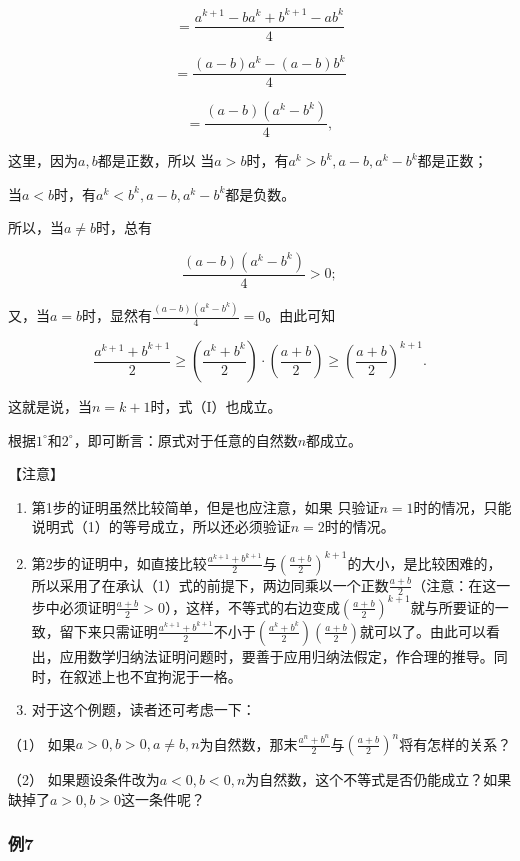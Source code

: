 \[
= \frac{a^{k + 1} - b a^{k} + b^{k + 1} - a b^{k}}{4}
\]

\[
= \frac{(a - b) a^{k} - (a - b) b^{k}}{4}
\]

\[
= \frac{(a - b) (a^{k} - b^{k})}{4}, \tag {4}
\]

这里，因为\(a, b\)都是正数，所以
当\(a > b\)时，有\(a^k > b^k, a - b, a^k - b^k\)都是正数；

当\(a < b\)时，有\(a^k < b^k, a - b, a^k - b^k\)都是负数。

所以，当\(a \neq b\)时，总有

\[
\frac{(a - b) (a^{k} - b^{k})}{4} > 0;
\]

又，当\(a = b\)时，显然有\(\frac{(a - b)(a^k - b^k)}{4} = 0\)。由此可知

\[
\frac{a^{k + 1} + b^{k + 1}}{2} \geqslant \left(\frac{a^{k} + b^{k}}{2}\right) \cdot \left(\frac{a + b}{2}\right) \geqslant \left(\frac{a + b}{2}\right)^{k + 1}.
\]

这就是说，当\(n = k + 1\)时，式（I）也成立。

根据\(1^{\circ}\)和\(2^{\circ}\)，即可断言：原式对于任意的自然数\(n\)都成立。

【注意】

\begin{enumerate}
\item
  第1步的证明虽然比较简单，但是也应注意，如果
  只验证\(n = 1\)时的情况，只能说明式（1）的等号成立，所以还必须验证\(n = 2\)时的情况。
\item
  第2步的证明中，如直接比较\(\frac{a^{k+1} + b^{k+1}}{2}\)与\(\left(\frac{a + b}{2}\right)^{k+1}\)的大小，是比较困难的，所以采用了在承认（1）式的前提下，两边同乘以一个正数\(\frac{a + b}{2}\)（注意：在这一步中必须证明\(\frac{a + b}{2} > 0\)），这样，不等式的右边变成\(\left(\frac{a + b}{2}\right)^{k+1}\)就与所要证的一致，留下来只需证明\(\frac{a^{k+1} + b^{k+1}}{2}\)不小于\(\left(\frac{a^k + b^k}{2}\right)\left(\frac{a + b}{2}\right)\)就可以了。由此可以看出，应用数学归纳法证明问题时，要善于应用归纳法假定，作合理的推导。同时，在叙述上也不宜拘泥于一格。
\item
  对于这个例题，读者还可考虑一下：
\end{enumerate}

（1）
如果\(a > 0, b > 0, a \neq b, n\)为自然数，那末\(\frac{a^n + b^n}{2}\)与\(\left(\frac{a + b}{2}\right)^n\)将有怎样的关系？

（2）
如果题设条件改为\(a < 0, b < 0, n\)为自然数，这个不等式是否仍能成立？如果缺掉了\(a > 0, b > 0\)这一条件呢？

\subsubsection{例7}

